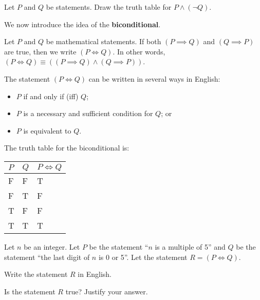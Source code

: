 \begin{exercise}
    Let $P$ and $Q$ be statements. Draw the truth table for $P \land (\lnot Q)$.
\end{exercise}

We now introduce the idea of the \textbf{biconditional}.
\begin{definition}
    Let $P$ and $Q$ be mathematical statements. If both $(P \implies Q)$ and $(Q \implies P)$ are true, then we write $(P \iff Q)$. In other words, $(P \iff Q) \equiv ((P \implies Q) \land (Q \implies P))$.
\end{definition}
\begin{remark}
    The statement $(P \iff Q)$ can be written in several ways in English:
    \begin{itemize}
        \item $P$ if and only if (iff) $Q$;
        \item $P$ is a necessary and sufficient condition for $Q$; or
        \item $P$ is equivalent to $Q$.
    \end{itemize}
\end{remark}

\newpage

The truth table for the biconditional is:
\begin{table}[h]
    \centering
    \begin{tabular}{|l|l||l|}
        \hline
        $P$ & $Q$ & $P\iff Q$ \\ \hline
        F   & F   & T         \\ \hline
        F   & T   & F         \\ \hline
        T   & F   & F         \\ \hline
        T   & T   & T         \\ \hline
    \end{tabular}
\end{table}

\begin{exercise}
    Let $n$ be an integer. Let $P$ be the statement ``$n$ is a multiple of 5'' and $Q$ be the statement ``the last digit of $n$ is 0 or 5''. Let the statement $R = (P \iff Q)$.
    \begin{partquestions}{\roman*}
        \item Write the statement $R$ in English.
        \item Is the statement $R$ true? Justify your answer.
    \end{partquestions}
\end{exercise}

